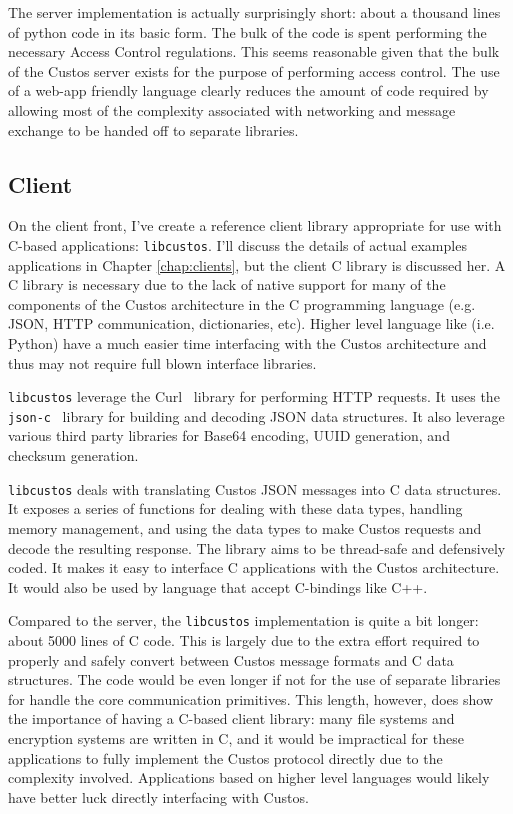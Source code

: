 The server implementation is actually surprisingly short: about a thousand
lines of python code in its basic form. The bulk of the code is spent
performing the necessary Access Control regulations. This seems
reasonable given that the bulk of the Custos server exists for the
purpose of performing access control. The use of a web-app friendly
language clearly reduces the amount of code required by allowing most of
the complexity associated with networking and message exchange to be
handed off to separate libraries.

\subsection{Client}

On the client front, I've create a reference client library appropriate
for use with C-based applications: \texttt{libcustos}. I'll discuss the
details of actual examples applications in Chapter \ref{chap:clients},
but the client C library is discussed her. A C library is necessary
due to the lack of native support for many of the components of the
Custos architecture in the C programming language (e.g. JSON, HTTP
communication, dictionaries, etc). Higher level language like
(i.e. Python) have a much easier time interfacing with the Custos
architecture and thus may not require full blown interface libraries.

\texttt{libcustos} leverage the Curl~\cite{curl} library for
performing HTTP requests. It uses the \texttt{json-c}~\cite{json-c}
library for building and decoding JSON data structures. It also
leverage various third party libraries for Base64 encoding, UUID
generation, and checksum generation.

\texttt{libcustos} deals with translating Custos JSON messages into C
data structures. It exposes a series of functions for dealing with
these data types, handling memory management, and using the data types
to make Custos requests and decode the resulting response. The library
aims to be thread-safe and defensively coded. It makes it easy to
interface C applications with the Custos architecture. It would also
be used by language that accept C-bindings like C++.

Compared to the server, the \texttt{libcustos} implementation is quite
a bit longer: about 5000 lines of C code. This is largely due to the
extra effort required to properly and safely convert between Custos
message formats and C data structures. The code would be even longer
if not for the use of separate libraries for handle the core
communication primitives. This length, however, does show the
importance of having a C-based client library: many file systems and
encryption systems are written in C, and it would be impractical for
these applications to fully implement the Custos protocol directly due
to the complexity involved. Applications based on higher level
languages would likely have better luck directly interfacing with
Custos.

